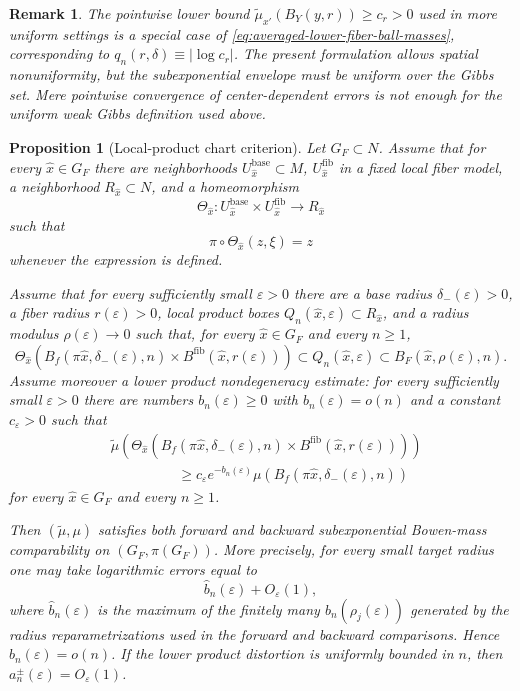 \documentclass[11pt,a4paper]{article}
\newtheorem{proposition}[theorem]{Proposition}
\newtheorem{remark}[theorem]{Remark}
\newcommand{\eps}{\varepsilon}
\begin{document}
\begin{remark}
The pointwise lower bound
$\widetilde\mu_{x'}(B_Y(y,r))\ge c_r>0$ used in more uniform settings is a
special case of \eqref{eq:averaged-lower-fiber-ball-masses}, corresponding to
$q_n(r,\delta)\equiv |\log c_r|$. The present formulation allows spatial
nonuniformity, but the subexponential envelope must be uniform over the Gibbs
set. Mere pointwise convergence of center-dependent errors is not enough for
the uniform weak Gibbs definition used above.
\end{remark}

\begin{proposition}[Local-product chart criterion]
\label{prop:local-product-bowen}
Let $G_F\subset N$. Assume that for every $\hat x\in G_F$ there are
neighborhoods $U_{\hat x}^{\mathrm{base}}\subset M$,
$U_{\hat x}^{\mathrm{fib}}$ in a fixed local fiber model, a neighborhood
$R_{\hat x}\subset N$, and a homeomorphism
\[
\Theta_{\hat x}:
U_{\hat x}^{\mathrm{base}}\times U_{\hat x}^{\mathrm{fib}}
\longrightarrow R_{\hat x}
\]
such that
\[
\pi\circ\Theta_{\hat x}(z,\xi)=z
\]
whenever the expression is defined.

Assume that for every sufficiently small $\eps>0$ there are a base radius
$\delta_-(\eps)>0$, a fiber radius $r(\eps)>0$, local product boxes
$Q_n(\hat x,\eps)\subset R_{\hat x}$, and a radius modulus
$\rho(\eps)\to0$ such that, for every $\hat x\in G_F$ and every $n\ge1$,
\begin{equation}
\label{eq:local-product-chart-lower}
\Theta_{\hat x}\!\left(
B_f(\pi\hat x,\delta_-(\eps),n)\times
B^{\mathrm{fib}}(\hat x,r(\eps))
\right)
\subset
Q_n(\hat x,\eps)
\subset
B_F(\hat x,\rho(\eps),n).
\end{equation}
Assume moreover a lower product nondegeneracy estimate: for every sufficiently
small $\eps>0$ there are numbers $b_n(\eps)\ge0$ with $b_n(\eps)=o(n)$ and a
constant $c_\eps>0$ such that
\begin{align}
\label{eq:local-product-chart-mass}
&\widetilde\mu\!\left(
\Theta_{\hat x}\!\left(
B_f(\pi\hat x,\delta_-(\eps),n)\times
B^{\mathrm{fib}}(\hat x,r(\eps))
\right)\right)
\nonumber\\
&\hspace{2cm}\ge
c_\eps e^{-b_n(\eps)}
\mu(B_f(\pi\hat x,\delta_-(\eps),n))
\end{align}
for every $\hat x\in G_F$ and every $n\ge1$.

Then $(\widetilde\mu,\mu)$ satisfies both forward and backward
subexponential Bowen-mass comparability on $(G_F,\pi(G_F))$. More precisely,
for every small target radius one may take logarithmic errors equal to
\[
\widehat b_n(\eps)+O_\eps(1),
\]
where $\widehat b_n(\eps)$ is the maximum of the finitely many
$b_n(\rho_j(\eps))$ generated by the radius reparametrizations used in the
forward and backward comparisons. Hence $\widehat b_n(\eps)=o(n)$. If the
lower product distortion is uniformly bounded in $n$, then
$a_n^\pm(\eps)=O_\eps(1)$.
\end{proposition}
\end{document}
